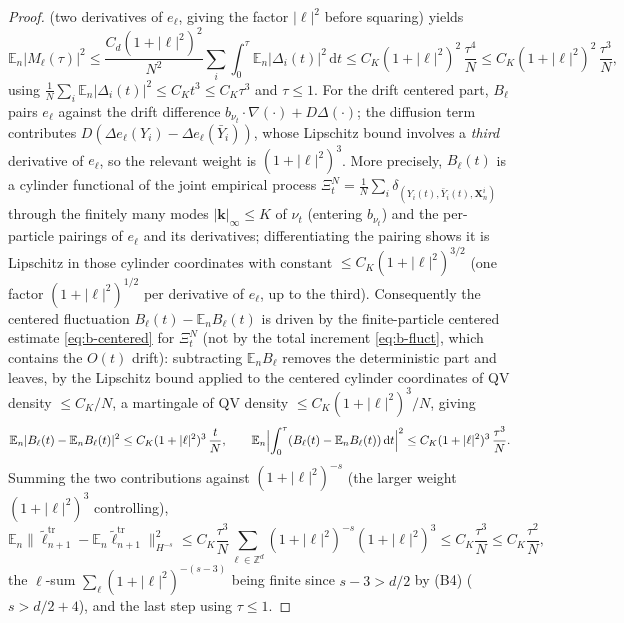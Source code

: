 \documentclass[a4paper,fleqn]{cas-sc}
\theoremstyle{definition}
\theoremstyle{remark}
\begin{document}
\begin{proof}
(two derivatives of $e_\ell$, giving the factor $|\ell|^2$ before squaring) yields
\[
\mathbb E_n|M_\ell(\tau)|^2
\le\frac{C_d(1+|\ell|^2)^2}{N^2}\sum_i\int_0^\tau\mathbb E_n|\Delta_i(t)|^2\,\mathrm dt
\le C_K(1+|\ell|^2)^2\,\frac{\tau^4}{N}
\le C_K(1+|\ell|^2)^2\,\frac{\tau^3}{N},
\]
using $\frac1N\sum_i\mathbb E_n|\Delta_i(t)|^2\le C_Kt^3\le C_K\tau^3$ and $\tau\le1$.
For the drift centered part, $B_\ell$ pairs $e_\ell$ against the drift
difference $b_{\nu_t}\!\cdot\!\nabla(\cdot)+D\Delta(\cdot)$; the diffusion term
contributes $D(\Delta e_\ell(Y_i)-\Delta e_\ell(\bar Y_i))$, whose Lipschitz
bound involves a \emph{third} derivative of $e_\ell$, so the relevant weight is
$(1+|\ell|^2)^3$. More precisely, $B_\ell(t)$ is a cylinder functional of the
joint empirical process
$\Xi^N_t=\frac1N\sum_i\delta_{(Y_i(t),\bar Y_i(t),\mathbf X^i_n)}$ through the
finitely many modes $|\mathbf k|_\infty\le K$ of $\nu_t$ (entering $b_{\nu_t}$) and
the per-particle pairings of $e_\ell$ and its derivatives; differentiating the
pairing shows it is Lipschitz in those cylinder coordinates with constant
$\le C_K(1+|\ell|^2)^{3/2}$ (one factor $(1+|\ell|^2)^{1/2}$ per derivative of
$e_\ell$, up to the third). Consequently the centered fluctuation
$B_\ell(t)-\mathbb E_nB_\ell(t)$ is driven by the finite-particle centered estimate
\eqref{eq:b-centered} for $\Xi^N_t$ (not by the total increment
\eqref{eq:b-fluct}, which contains the $O(t)$ drift): subtracting
$\mathbb E_nB_\ell$ removes the deterministic part and leaves, by the Lipschitz
bound applied to the centered cylinder coordinates of QV density $\le C_K/N$, a
martingale of QV density $\le C_K(1+|\ell|^2)^3/N$, giving
\[
\mathbb E_n|B_\ell(t)-\mathbb E_nB_\ell(t)|^2\le C_K(1+|\ell|^2)^3\,\frac tN,
\qquad
\mathbb E_n\Bigl|\int_0^\tau(B_\ell(t)-\mathbb E_nB_\ell(t))\,\mathrm dt\Bigr|^2
\le C_K(1+|\ell|^2)^3\,\frac{\tau^3}{N}.
\]
Summing the two contributions against $(1+|\ell|^2)^{-s}$ (the larger weight
$(1+|\ell|^2)^3$ controlling),
\[
\mathbb E_n\|\tilde\ell^{\mathrm{tr}}_{n+1}-\mathbb E_n\tilde\ell^{\mathrm{tr}}_{n+1}\|_{H^{-s}}^2
\le C_K\frac{\tau^3}{N}\sum_{\ell\in\mathbb Z^d}(1+|\ell|^2)^{-s}(1+|\ell|^2)^3
\le C_K\frac{\tau^3}{N}\le C_K\frac{\tau^2}{N},
\]
the $\ell$-sum $\sum_\ell(1+|\ell|^2)^{-(s-3)}$ being finite since $s-3>d/2$ by
(B4) ($s>d/2+4$), and the last step using $\tau\le1$.


\end{proof}
\end{document}
